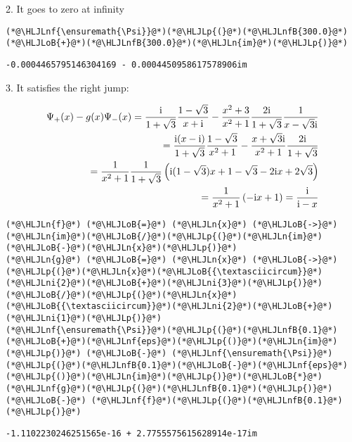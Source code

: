 \documentclass[12pt,a4paper]{article}
\newcommand{\HLJLn}[1]{#1}
\newcommand{\HLJLnf}[1]{\textcolor[RGB]{66,102,213}{#1}}
\newcommand{\HLJLnfB}[1]{\textcolor[RGB]{59,151,46}{#1}}
\newcommand{\HLJLni}[1]{\textcolor[RGB]{59,151,46}{#1}}
\newcommand{\HLJLoB}[1]{\textcolor[RGB]{102,102,102}{\textbf{#1}}}
\newcommand{\HLJLp}[1]{#1}
\def\I{ {\rm i} }
\begin{document}
2. It goes to zero at infinity


\begin{lstlisting}
(*@\HLJLnf{\ensuremath{\Psi}}@*)(*@\HLJLp{(}@*)(*@\HLJLnfB{300.0}@*)(*@\HLJLoB{+}@*)(*@\HLJLnfB{300.0}@*)(*@\HLJLn{im}@*)(*@\HLJLp{)}@*)
\end{lstlisting}

\begin{lstlisting}
-0.0004465795146304169 - 0.0004450958617578906im
\end{lstlisting}


3. It satisfies the right jump:


\begin{align*}
 \Psi_+(x) - g(x) \Psi_-(x) = {\I \over 1+\sqrt 3} {1-\sqrt 3 \over x+\I}  - {x^2 + 3 \over x^2 + 1}
{2 \I  \over 1+ \sqrt{3}} {1 \over x-\sqrt{3}\I}  \\
 = {\I (x-\I) \over 1+\sqrt 3} {1-\sqrt 3 \over x^2+1}  - {x + \sqrt{3} \I \over x^2 + 1}
{2 \I  \over 1+ \sqrt{3}}  \\
= {1\over x^2 + 1}
{1 \over 1+ \sqrt{3}}  \left(\I(1-\sqrt 3) x+1-\sqrt{3}  - 2\I x + 2 \sqrt{3}    \right) \\
= {1\over x^2 + 1}
 \left(-\I x+1    \right) = {\I \over \I - x}
\end{align*}

\begin{lstlisting}
(*@\HLJLn{f}@*) (*@\HLJLoB{=}@*) (*@\HLJLn{x}@*) (*@\HLJLoB{->}@*) (*@\HLJLn{im}@*)(*@\HLJLoB{/}@*)(*@\HLJLp{(}@*)(*@\HLJLn{im}@*)(*@\HLJLoB{-}@*)(*@\HLJLn{x}@*)(*@\HLJLp{)}@*)
(*@\HLJLn{g}@*) (*@\HLJLoB{=}@*) (*@\HLJLn{x}@*) (*@\HLJLoB{->}@*) (*@\HLJLp{(}@*)(*@\HLJLn{x}@*)(*@\HLJLoB{{\textasciicircum}}@*)(*@\HLJLni{2}@*)(*@\HLJLoB{+}@*)(*@\HLJLni{3}@*)(*@\HLJLp{)}@*)(*@\HLJLoB{/}@*)(*@\HLJLp{(}@*)(*@\HLJLn{x}@*)(*@\HLJLoB{{\textasciicircum}}@*)(*@\HLJLni{2}@*)(*@\HLJLoB{+}@*)(*@\HLJLni{1}@*)(*@\HLJLp{)}@*)
(*@\HLJLnf{\ensuremath{\Psi}}@*)(*@\HLJLp{(}@*)(*@\HLJLnfB{0.1}@*)(*@\HLJLoB{+}@*)(*@\HLJLnf{eps}@*)(*@\HLJLp{()}@*)(*@\HLJLn{im}@*)(*@\HLJLp{)}@*) (*@\HLJLoB{-}@*) (*@\HLJLnf{\ensuremath{\Psi}}@*)(*@\HLJLp{(}@*)(*@\HLJLnfB{0.1}@*)(*@\HLJLoB{-}@*)(*@\HLJLnf{eps}@*)(*@\HLJLp{()}@*)(*@\HLJLn{im}@*)(*@\HLJLp{)}@*)(*@\HLJLoB{*}@*)(*@\HLJLnf{g}@*)(*@\HLJLp{(}@*)(*@\HLJLnfB{0.1}@*)(*@\HLJLp{)}@*) (*@\HLJLoB{-}@*) (*@\HLJLnf{f}@*)(*@\HLJLp{(}@*)(*@\HLJLnfB{0.1}@*)(*@\HLJLp{)}@*)
\end{lstlisting}

\begin{lstlisting}
-1.1102230246251565e-16 + 2.7755575615628914e-17im
\end{lstlisting}
\end{document}
